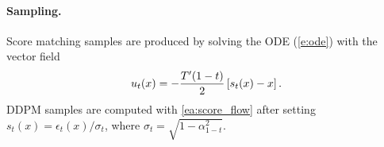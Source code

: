 \documentclass{article}
\renewcommand{\ra}[1]{\renewcommand{\arraystretch}{#1}}
\newcommand{\tcen}[1]{\multicolumn{1}{c}{#1}}
\newcommand{\tnan}{\tcen{--}}
\begin{document}
{\paragraph{Sampling.} Score matching samples are produced by solving the ODE (\eqref{e:ode}) with the vector field
\begin{equation}\label{ea:score_flow}
    u_t(x) = -\frac{T'(1-t)}{2}\left [s_t(x) - x\right ].
\end{equation} 
DDPM samples are computed with \eqref{ea:score_flow} after setting $s_t(x) = \epsilon_t(x)/\sigma_t$, where $\sigma_t = \sqrt{1-\alpha_{1-t}^2}$. 
}



\end{document}

